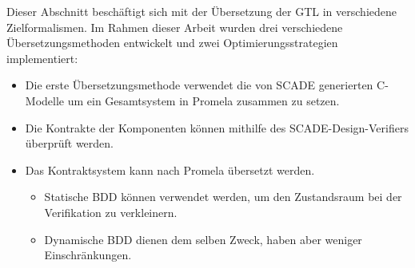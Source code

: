 Dieser Abschnitt beschäftigt sich mit der Übersetzung der GTL in verschiedene Zielformalismen.
Im Rahmen dieser Arbeit wurden drei verschiedene Übersetzungsmethoden entwickelt und zwei Optimierungsstrategien implementiert:
\begin{itemize}
\item Die erste Übersetzungsmethode verwendet die von SCADE generierten C-Modelle um ein Gesamtsystem in Promela zusammen zu setzen.
\item Die Kontrakte der Komponenten können mithilfe des SCADE-Design-Verifiers überprüft werden.
\item Das Kontraktsystem kann nach Promela übersetzt werden.
  \begin{itemize}
  \item Statische BDD können verwendet werden, um den Zustandsraum bei der Verifikation zu verkleinern.
  \item Dynamische BDD dienen dem selben Zweck, haben aber weniger Einschränkungen.
  \end{itemize}
\end{itemize}
